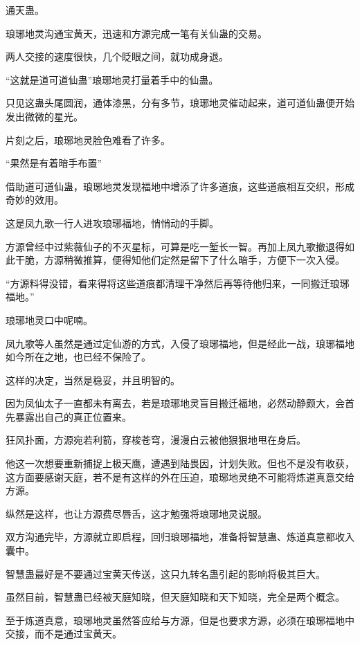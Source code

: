
\begin{this_body}

通天蛊。

琅琊地灵沟通宝黄天，迅速和方源完成一笔有关仙蛊的交易。

两人交接的速度很快，几个眨眼之间，就功成身退。

“这就是道可道仙蛊”琅琊地灵打量着手中的仙蛊。

只见这蛊头尾圆润，通体漆黑，分有多节，琅琊地灵催动起来，道可道仙蛊便开始发出微微的星光。

片刻之后，琅琊地灵脸色难看了许多。

“果然是有着暗手布置”

借助道可道仙蛊，琅琊地灵发现福地中增添了许多道痕，这些道痕相互交织，形成奇妙的效用。

这是凤九歌一行人进攻琅琊福地，悄悄动的手脚。

方源曾经中过紫薇仙子的不灭星标，可算是吃一堑长一智。再加上凤九歌撤退得如此干脆，方源稍微推算，便得知他们定然是留下了什么暗手，方便下一次入侵。

“方源料得没错，看来得将这些道痕都清理干净然后再等待他归来，一同搬迁琅琊福地。”

琅琊地灵口中呢喃。

凤九歌等人虽然是通过定仙游的方式，入侵了琅琊福地，但是经此一战，琅琊福地如今所在之地，也已经不保险了。

这样的决定，当然是稳妥，并且明智的。

因为凤仙太子一直都未有离去，若是琅琊地灵盲目搬迁福地，必然动静颇大，会首先暴露出自己的真正位置来。

狂风扑面，方源宛若利箭，穿梭苍穹，漫漫白云被他狠狠地甩在身后。

他这一次想要重新捕捉上极天鹰，遭遇到陆畏因，计划失败。但也不是没有收获，这方面要感谢天庭，若不是有这样的外在压迫，琅琊地灵绝不可能将炼道真意交给方源。

纵然是这样，也让方源费尽唇舌，这才勉强将琅琊地灵说服。

双方沟通完毕，方源就立即启程，回归琅琊福地，准备将智慧蛊、炼道真意都收入囊中。

智慧蛊最好是不要通过宝黄天传送，这只九转名蛊引起的影响将极其巨大。

虽然目前，智慧蛊已经被天庭知晓，但天庭知晓和天下知晓，完全是两个概念。

至于炼道真意，琅琊地灵虽然答应给与方源，但是也要求方源，必须在琅琊福地中交接，而不是通过宝黄天。


\end{this_body}
